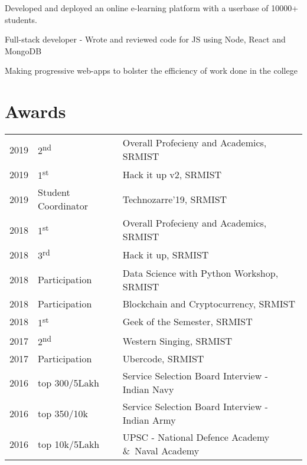 \documentclass[]{surya-resume}
\begin{document}
\begin{minipage}[t]{0.65\textwidth}
\begin{tightemize}
\end{tightemize}
\sectionsep
{}
\begin{tightemize}
\item Developed and deployed an online e-learning platform with a userbase of 10000+ students.
\item Full-stack developer - Wrote and reviewed code for JS using Node, React and MongoDB 
\item Making progressive web-apps to bolster the efficiency of work done in the college 
\end{tightemize}

\sectionsep



\section{Awards} 
\begin{tabular}{rll}
2019	     & 2\textsuperscript{nd}  & Overall Profecieny and Academics, SRMIST\\
2019	     & 1\textsuperscript{st}  & Hack it up v2, SRMIST\\    
2019	     & Student Coordinator  & Technozarre'19, SRMIST\\    
2018	     & 1\textsuperscript{st}  & Overall Profecieny and Academics, SRMIST\\
2018	     & 3\textsuperscript{rd}  & Hack it up, SRMIST\\
2018	     & Participation  & Data Science with Python Workshop, SRMIST\\    
2018	     & Participation  & Blockchain and Cryptocurrency, SRMIST\\    
2018	     & 1\textsuperscript{st}  & Geek of the Semester, SRMIST\\
2017	     & 2\textsuperscript{nd}  & Western Singing, SRMIST\\
2017	     & Participation  & Ubercode, SRMIST\\    
2016     & top 300/5Lakh & Service Selection Board Interview - Indian Navy  \\
2016     & top 350/10k & Service Selection Board Interview - Indian Army  \\
2016	     & top 10k/5Lakh  & UPSC - National Defence Academy \&\ Naval Academy\\
\end{tabular}
\sectionsep



%
%

\end{minipage} 
\end{document}
